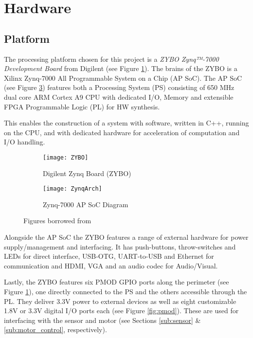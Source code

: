 \documentclass[Main]{subfiles}
\begin{document}
\section{Hardware} %
\label{sec:hardware}

	\subsection{Platform} %
	\label{sub:platform}

		The processing platform chosen for this project is a \emph{ZYBO Zynq™-7000 Development Board} from Digilent (see Figure \ref{fig:ZYBO}).
		The brains of the ZYBO is a Xilinx Zynq-7000 All Programmable System on a Chip (AP SoC).
		The AP SoC (see Figure \ref{fig:ZynqArch}) features both a Processing System (PS) consisting of 650 MHz dual core ARM\textregistered{} Cortex A9 CPU with dedicated I/O, Memory and extensible FPGA Programmable Logic (PL) for HW synthesis.

		This enables the construction of a system with software, written in C++, running on the CPU, and with dedicated hardware for acceleration of computation and I/O handling.
		\begin{figure}[H]
			\centering
			\begin{subfigure}[b]{0.55\linewidth}
				\texttt{[image: ZYBO]}
				\caption{Digilent Zynq Board (ZYBO)}
				\label{fig:ZYBO}
			\end{subfigure}		
			\begin{subfigure}[b]{0.4\linewidth}
				\texttt{[image: ZynqArch]}
				\caption{Zynq-7000 AP SoC Diagram}
				\label{fig:ZynqArch}
			\end{subfigure}
			\caption{Figures borrowed from \cite{Digilent2014}}		
		\end{figure}

		Alongside the AP SoC the ZYBO features a range of external hardware for power supply/management and interfacing.
		It has push-buttons, throw-switches and LEDs for direct interface, USB-OTG, UART-to-USB and Ethernet for communication and HDMI, VGA and an audio codec for Audio/Visual.

		Lastly, the ZYBO features six PMOD GPIO ports along the perimeter (see Figure \ref{fig:ZYBO}), one directly connected to the PS and the others accessible through the PL.
		They deliver 3.3V power to external devices as well as eight customizable 1.8V or 3.3V digital I/O ports each (see Figure \ref{fig:pmod}).
		These are used for interfacing with the sensor and motor (see Sections \ref{sub:sensor} \& \ref{sub:motor_control}, respectively).
\end{document}
